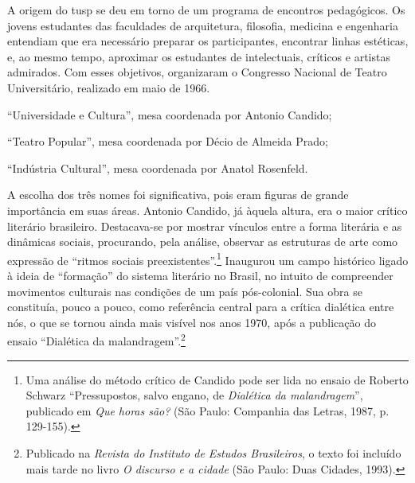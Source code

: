 \subject{Para definir a orientação do grupo e estabelecer parcerias}

A origem do {\sc tusp} se deu em torno de um programa de encontros
pedagógicos. Os jovens estudantes das faculdades de arquitetura,
filosofia, medicina e engenharia entendiam que era necessário preparar
os participantes, encontrar linhas estéticas, e, ao mesmo tempo, aproximar
os estudantes de intelectuais, críticos e artistas admirados. Com esses
objetivos, organizaram o Congresso Nacional de Teatro
Universitário, realizado em maio de 1966.


\startitemize[n,packed]
\item
  “Universidade e Cultura”, mesa coordenada por Antonio Candido;
\item
  “Teatro Popular”, mesa coordenada por Décio de Almeida Prado;
\item
  “Indústria Cultural”, mesa coordenada por Anatol Rosenfeld.
\stopitemize

A escolha dos três nomes foi significativa, pois eram figuras de
grande importância em suas áreas. Antonio Candido, já àquela altura, era
o maior crítico literário brasileiro. Destacava-se por mostrar vínculos
entre a forma literária e as dinâmicas sociais, procurando, pela
análise, observar as estruturas de arte como expressão de “ritmos
sociais preexistentes”.\footnote{Uma análise do método crítico de Candido
  pode ser lida no ensaio de Roberto Schwarz “Pressupostos, salvo
  engano, de {\it Dialética da malandragem}”, publicado em {\it Que
  horas são?} (São Paulo: Companhia das Letras, 1987, p.\,129-155).}
Inaugurou um campo histórico ligado à ideia de “formação” do sistema
literário no Brasil, no intuito de compreender movimentos culturais nas
condições de um país pós-colonial. Sua obra se constituía, pouco a
pouco, como referência central para a crítica dialética entre nós, o que
se tornou ainda mais visível nos anos 1970, após a publicação do ensaio
“Dialética da malandragem”.\footnote{Publicado na {\it Revista do Instituto de Estudos Brasileiros}, o texto foi incluído mais tarde no livro {\it O
  discurso e a cidade} (São Paulo: Duas Cidades, 1993).}

